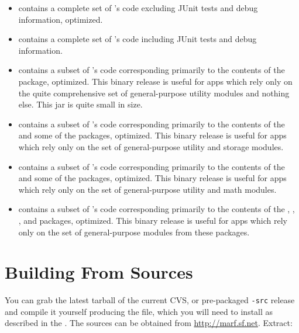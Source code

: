 \begin{itemize}

\item
{} contains a complete set of {\marf}'s code
excluding JUnit tests and debug information, optimized.

\item
{} contains a complete set of {\marf}'s code
including JUnit tests and debug information.

\item
{} contains a subset of {\marf}'s code
corresponding primarily to the contents of the  package, optimized.
This binary release is useful for apps which rely only on the quite comprehensive set
of general-purpose utility modules and nothing else. This jar is quite small
in size.

\item
{} contains a subset of {\marf}'s code
corresponding primarily to the contents of the  and some of the  packages, optimized.
This binary release is useful for apps which rely only on the set
of general-purpose utility and storage modules.

\item
{} contains a subset of {\marf}'s code
corresponding primarily to the contents of the  and some of the  packages, optimized.
This binary release is useful for apps which rely only on the set
of general-purpose utility and math modules.

\item
{} contains a subset of {\marf}'s code
corresponding primarily to the contents of the , , , and  packages, optimized.
This binary release is useful for apps which rely only on the set
of general-purpose modules from these packages.

\end{itemize}

\section{Building From Sources}

You can grab the latest tarball of the current CVS,
or pre-packaged \texttt{-src} release
and compile it yourself producing the  file, which
you will need to install as described in the .
The {\marf} sources can be obtained
from \url{http://marf.sf.net}. Extract:

